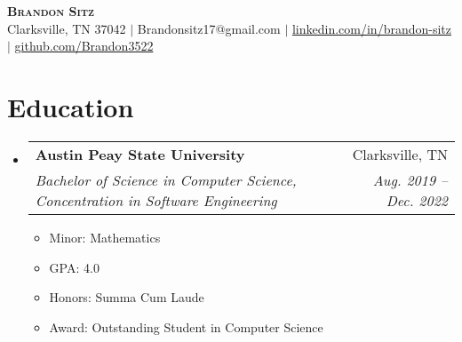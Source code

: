 \documentclass[letterpaper,11pt]{article}
\makeatletter
\newcommand{\resumeItem}[1]{
  \item\small{
    {#1 \vspace{-2pt}}
  }
}
\newcommand{\resumeSubheading}[4]{
  \vspace{-2pt}\item
    \begin{tabular*}{0.97\textwidth}[t]{l@{\extracolsep{\fill}}r}
      \textbf{#1} & #2 \\
      \textit{\small#3} & \textit{\small #4} \\
    \end{tabular*}\vspace{-7pt}
}
\newcommand{\resumeSubHeadingListStart}{\begin{itemize}[leftmargin=0.15in, label={}]}
\newcommand{\resumeSubHeadingListEnd}{\end{itemize}}
\newcommand{\resumeItemListStart}{\begin{itemize}}
\newcommand{\resumeItemListEnd}{\end{itemize}\vspace{-5pt}}
\makeatother
\begin{document}



\begin{center}
    \textbf{\Huge \scshape Brandon Sitz} \\ \vspace{1pt}
		{Clarksville, TN 37042} $|$
		{Brandonsitz17@gmail.com} $|$ 
    \href{https://linkedin.com/in/brandon-sitz}{linkedin.com/in/brandon-sitz} $|$
    \href{https://github.com/Brandon3522}{github.com/Brandon3522}
\end{center}


\section{Education}
  \resumeSubHeadingListStart
    \resumeSubheading
      {Austin Peay State University}{Clarksville, TN}
      {Bachelor of Science in Computer Science, Concentration in Software Engineering}{Aug. 2019 -- Dec. 2022}
			\resumeItemListStart
				\resumeItem{Minor: Mathematics}
        \resumeItem{GPA: 4.0}
        \resumeItem{Honors: Summa Cum Laude}
        \resumeItem{Award: Outstanding Student in Computer Science}
      \resumeItemListEnd
  \resumeSubHeadingListEnd


	
\end{document}
